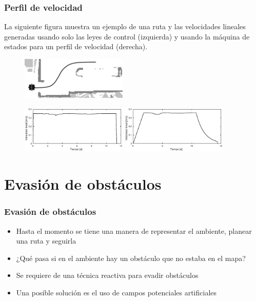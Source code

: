 \documentclass[10pt,spanish,aspectratio=1610]{beamer}
\begin{document}
\begin{frame}\frametitle{Perfil de velocidad}
  La siguiente figura muestra un ejemplo de una ruta y las velocidades lineales generadas usando solo las leyes de control (izquierda) y usando la máquina de estados para un perfil de velocidad (derecha). 
  \begin{figure}
    \centering
    \includegraphics[width=0.45\textwidth]{Figures/SpeedProfilePath.png}
  \end{figure}
  \begin{figure}
    \centering
    \includegraphics[width=0.45\textwidth]{Figures/SpeedWithoutProfile.eps}
    \includegraphics[width=0.45\textwidth]{Figures/SpeedWithProfile.eps}
  \end{figure}
\end{frame}

\section{Evasión de obstáculos}
\begin{frame}\frametitle{Evasión de obstáculos}
  \begin{itemize}
  \item Hasta el momento se tiene una manera de representar el ambiente, planear una ruta y seguirla
  \item ¿Qué pasa si en el ambiente hay un obstáculo que no estaba en el mapa?
  \item Se requiere de una técnica reactiva para evadir obstáculos
  \item Una posible solución es el uso de campos potenciales artificiales
  \end{itemize}
\end{frame}
\end{document}
